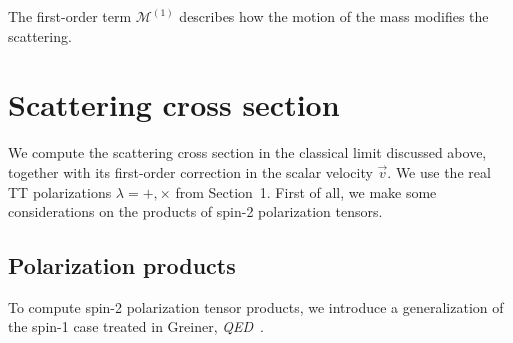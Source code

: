 \documentclass[12pt,a4paper,oneside]{article}
\numberwithin{equation}{section}   %
\begin{document}
The first-order term $\mathcal M^{(1)}$ describes how the
motion of the mass modifies the
scattering.

\newpage

\section{Scattering cross section}

We compute the scattering cross section in the classical limit discussed
above, together with its first-order correction in the scalar velocity
$\vec v$. We use the real TT polarizations
$\lambda=+,\times$ from Section~1.
First of all, we make some considerations on the products of spin-2 polarization
tensors.

\subsection{Polarization products}
To compute spin-2 polarization tensor products, we introduce a generalization
of the spin-1 case treated in Greiner, \textit{QED}~\cite{GreinerQED}.
\end{document}

